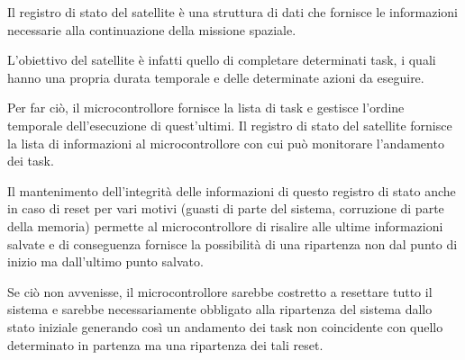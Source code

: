 \documentclass[LaM,binding=0.6cm]{../sapthesis}
\begin{document}
Il registro di stato del satellite è una struttura di dati che fornisce le informazioni necessarie alla continuazione della missione spaziale. 

L’obiettivo del satellite è infatti quello di completare determinati task, i quali hanno una propria durata temporale e delle determinate azioni da eseguire. 

Per far ciò, il microcontrollore fornisce la lista di task e gestisce l’ordine temporale dell’esecuzione di quest’ultimi.
Il registro di stato del satellite fornisce la lista di informazioni al microcontrollore con cui può monitorare l’andamento dei task.

Il mantenimento dell’integrità delle informazioni di questo registro di stato anche in caso di reset per vari motivi (guasti di parte del sistema, corruzione di parte della memoria) permette al microcontrollore di risalire alle ultime informazioni salvate e di conseguenza fornisce la possibilità di una ripartenza non dal punto di inizio ma dall’ultimo punto salvato. 

Se ciò non avvenisse, il microcontrollore sarebbe costretto a resettare tutto il sistema e sarebbe necessariamente obbligato alla ripartenza del sistema dallo stato iniziale generando così un andamento dei task non coincidente con quello determinato in partenza ma una ripartenza dei tali reset.
\end{document}
